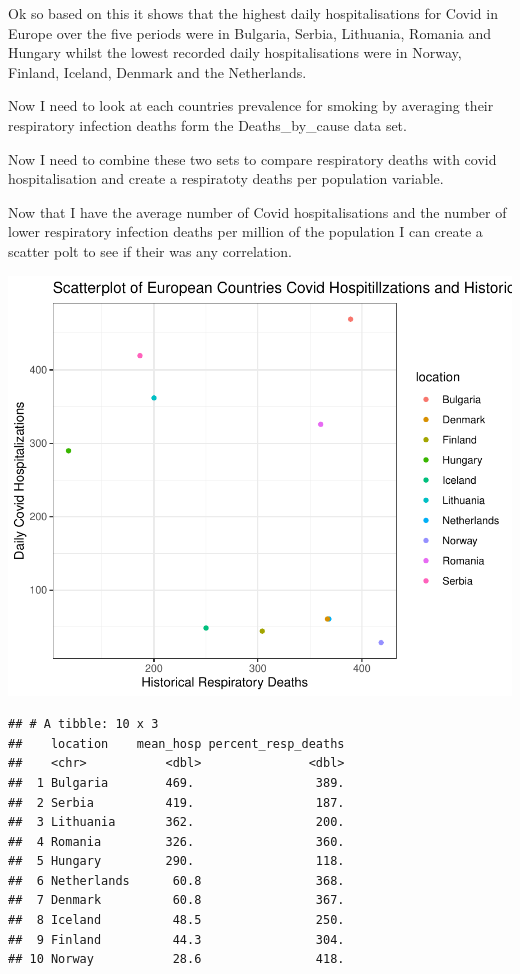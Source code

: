 \documentclass[11pt,preprint, authoryear]{elsarticle}
\numberwithin{equation}{section}
\numberwithin{figure}{section}
\numberwithin{table}{section}
\begin{document}
Ok so based on this it shows that the highest daily hospitalisations for
Covid in Europe over the five periods were in Bulgaria, Serbia,
Lithuania, Romania and Hungary whilst the lowest recorded daily
hospitalisations were in Norway, Finland, Iceland, Denmark and the
Netherlands.

Now I need to look at each countries prevalence for smoking by averaging
their respiratory infection deaths form the Deaths\_by\_cause data set.

Now I need to combine these two sets to compare respiratory deaths with
covid hospitalisation and create a respiratoty deaths per population
variable.

Now that I have the average number of Covid hospitalisations and the
number of lower respiratory infection deaths per million of the
population I can create a scatter polt to see if their was any
correlation.

\includegraphics{Question_1_files/figure-latex/unnamed-chunk-8-1.pdf}

\begin{verbatim}
## # A tibble: 10 x 3
##    location    mean_hosp percent_resp_deaths
##    <chr>           <dbl>               <dbl>
##  1 Bulgaria        469.                 389.
##  2 Serbia          419.                 187.
##  3 Lithuania       362.                 200.
##  4 Romania         326.                 360.
##  5 Hungary         290.                 118.
##  6 Netherlands      60.8                368.
##  7 Denmark          60.8                367.
##  8 Iceland          48.5                250.
##  9 Finland          44.3                304.
## 10 Norway           28.6                418.
\end{verbatim}
\end{document}
